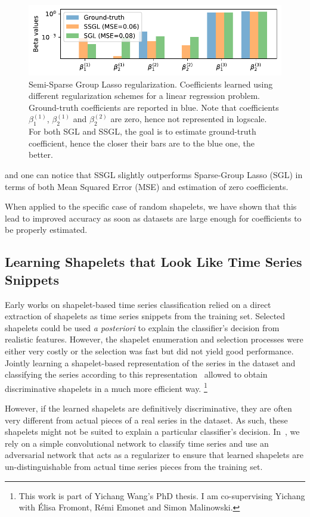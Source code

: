 \begin{figure}[t]
\centering
\includegraphics[width=.8\textwidth]{fig/ssgl}
\caption{Semi-Sparse Group Lasso regularization. Coefficients learned using
different regularization schemes for a linear regression problem. Ground-truth
coefficients are reported in blue.
Note that coefficients $\beta_1^{(1)}$, $\beta_2^{(1)}$ and $\beta_2^{(2)}$ are
zero, hence not represented in logscale.
For both SGL and SSGL, the goal is to estimate ground-truth coefficient, hence
the closer their bars are to the blue one, the better.
\label{fig:ssgl}}
\end{figure}

and one can notice that SSGL slightly outperforms Sparse-Group Lasso (SGL) in
terms of both Mean Squared Error (MSE) and estimation of zero coefficients.

When applied to the specific case of random shapelets, we have shown that this
lead to improved accuracy as soon as datasets are large enough for coefficients
to be properly estimated.

\subsection{Learning Shapelets that Look Like Time Series Snippets}

Early works on shapelet-based time series classification relied on a direct
extraction of shapelets as time series snippets from the training set.
Selected shapelets could be used \emph{a posteriori} to explain the classifier's
decision from realistic features.
However, the shapelet enumeration and selection processes were either very
costly or the selection was fast but did not yield good performance.
Jointly learning a shapelet-based representation of the series in the dataset
and classifying the series according to this
representation~\cite{grabocka2014learning} allowed to obtain
discriminative shapelets in a much more efficient way.%
\footnote{This work is part of Yichang Wang's PhD thesis.
I am co-supervising Yichang with Élisa Fromont, Rémi Emonet and Simon
Malinowski.}

However, if the learned shapelets are definitively discriminative, they are
often very different from actual pieces of a real series in the
dataset. As such, these shapelets might not be suited to explain a particular
classifier's decision.
In~\cite{wang2020},
we rely on a simple convolutional network to classify time
series and use an adversarial network that acts as a regularizer to ensure that
learned shapelets are un-distinguishable from actual time series pieces from
the training set.
